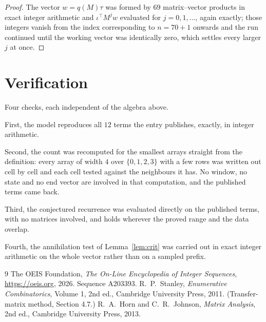 \documentclass[11pt,a4paper]{article}
\theoremstyle{plain}
\theoremstyle{definition}
\begin{document}
\begin{proof}
The vector $w=q(M)\tau$ was formed by $69$ matrix--vector products in exact integer
arithmetic and $\iota^{\!\top}M^{j}w$ evaluated for $j=0,1,\dots$, again exactly; those
integers vanish from the index corresponding to $n=70+1$ onwards and the run continued
until the working vector was identically zero, which settles every larger $j$ at once.
\end{proof}

\section{Verification}

Four checks, each independent of the algebra above.

First, the model reproduces all $12$ terms the entry publishes, exactly, in integer
arithmetic.

Second, the count was recomputed for the smallest arrays straight from the definition: every
array of width $4$ over $\{0,1,2,3\}$ with a few rows was written out cell by cell and each cell
tested against the neighbours it has. No window, no state and no end vector are involved in that
computation, and the published terms came back.

Third, the conjectured recurrence was evaluated directly on the published terms, with no
matrices involved, and holds wherever the proved range and the data overlap.

Fourth, the annihilation test of Lemma~\ref{lem:crit} was carried out in exact integer
arithmetic on the whole vector rather than on a sampled prefix.

\begin{thebibliography}{9}
 The OEIS Foundation, \emph{The On-Line Encyclopedia of Integer
Sequences}, \url{https://oeis.org}, 2026. Sequence A203393.
 R.~P.~Stanley, \emph{Enumerative Combinatorics}, Volume 1, 2nd ed.,
Cambridge University Press, 2011. (Transfer-matrix method, Section 4.7.)
 R.~A.~Horn and C.~R.~Johnson, \emph{Matrix Analysis}, 2nd ed., Cambridge
University Press, 2013.
\end{thebibliography}
\end{document}
